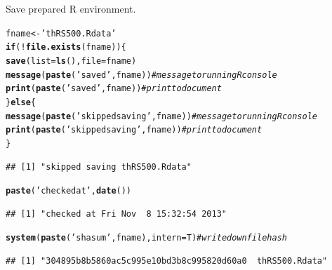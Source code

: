 \documentclass{article}\usepackage[]{graphicx}\usepackage[]{color}
\makeatletter
\newcommand{\hlstr}[1]{\textcolor[rgb]{0.192,0.494,0.8}{#1}}%
\newcommand{\hlcom}[1]{\textcolor[rgb]{0.678,0.584,0.686}{\textit{#1}}}%
\newcommand{\hlopt}[1]{\textcolor[rgb]{0,0,0}{#1}}%
\newcommand{\hlstd}[1]{\textcolor[rgb]{0.345,0.345,0.345}{#1}}%
\newcommand{\hlkwa}[1]{\textcolor[rgb]{0.161,0.373,0.58}{\textbf{#1}}}%
\newcommand{\hlkwb}[1]{\textcolor[rgb]{0.69,0.353,0.396}{#1}}%
\newcommand{\hlkwc}[1]{\textcolor[rgb]{0.333,0.667,0.333}{#1}}%
\newcommand{\hlkwd}[1]{\textcolor[rgb]{0.737,0.353,0.396}{\textbf{#1}}}%
\newenvironment{kframe}{%
 \def\at@end@of@kframe{}%
 \ifinner\ifhmode%
  \def\at@end@of@kframe{\end{minipage}}%
  \begin{minipage}{\columnwidth}%
 \fi\fi%
 \def\FrameCommand##1{\hskip\@totalleftmargin \hskip-\fboxsep
 \colorbox{shadecolor}{##1}\hskip-\fboxsep
     \hskip-\linewidth \hskip-\@totalleftmargin \hskip\columnwidth}%
 \MakeFramed {\advance\hsize-\width
   \@totalleftmargin\z@ \linewidth\hsize
   \@setminipage}}%
 {\par\unskip\endMakeFramed%
 \at@end@of@kframe}
\newenvironment{knitrout}{}{} %
\makeatother
\begin{document}
Save prepared R environment.
\begin{knitrout}
\color{fgcolor}\begin{kframe}
\begin{alltt}
\hlstd{fname} \hlkwb{<-} \hlstr{'thRS500.Rdata'}
\hlkwa{if}\hlstd{(}\hlopt{!}\hlkwd{file.exists}\hlstd{(fname)) \{}
   \hlkwd{save}\hlstd{(}\hlkwc{list}\hlstd{=}\hlkwd{ls}\hlstd{(),}\hlkwc{file}\hlstd{=fname)}
   \hlkwd{message}\hlstd{(}\hlkwd{paste}\hlstd{(}\hlstr{'saved'}\hlstd{,fname))}  \hlcom{# message to running R console}
   \hlkwd{print}\hlstd{(}\hlkwd{paste}\hlstd{(}\hlstr{'saved'}\hlstd{,fname))}    \hlcom{# print to document}
\hlstd{\}} \hlkwa{else} \hlstd{\{}
   \hlkwd{message}\hlstd{(}\hlkwd{paste}\hlstd{(}\hlstr{'skipped saving'}\hlstd{,fname))} \hlcom{# message to running R console}
   \hlkwd{print}\hlstd{(}\hlkwd{paste}\hlstd{(}\hlstr{'skipped saving'}\hlstd{,fname))}   \hlcom{# print to document}
\hlstd{\}}
\end{alltt}
\begin{verbatim}
## [1] "skipped saving thRS500.Rdata"
\end{verbatim}
\begin{alltt}
\hlkwd{paste}\hlstd{(}\hlstr{'checked at'}\hlstd{,}\hlkwd{date}\hlstd{())}
\end{alltt}
\begin{verbatim}
## [1] "checked at Fri Nov  8 15:32:54 2013"
\end{verbatim}
\begin{alltt}
\hlkwd{system}\hlstd{(}\hlkwd{paste}\hlstd{(}\hlstr{'shasum'}\hlstd{,fname),}\hlkwc{intern}\hlstd{=T)}  \hlcom{# write down file hash}
\end{alltt}
\begin{verbatim}
## [1] "304895b8b5860ac5c995e10bd3b8c995820d60a0  thRS500.Rdata"
\end{verbatim}
\end{kframe}
\end{knitrout}
\end{document}
